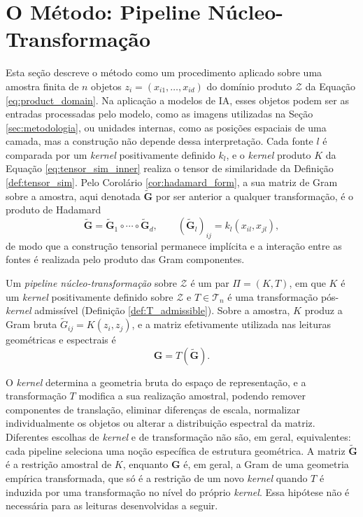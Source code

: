\section{O Método: Pipeline Núcleo-Transformação}
\label{sec:kernel_pipeline}

Esta seção descreve o método como um procedimento aplicado sobre uma amostra finita de $n$ objetos $z_i = (x_{i1},\dots,x_{id})$ do domínio produto $\mathcal{Z}$ da Equação \eqref{eq:product_domain}. Na aplicação a modelos de IA, esses objetos podem ser as entradas processadas pelo modelo, como as imagens utilizadas na Seção \ref{sec:metodologia}, ou unidades internas, como as posições espaciais de uma camada, mas a construção não depende dessa interpretação. Cada fonte $l$ é comparada por um \textit{kernel} positivamente definido $k_l$, e o \textit{kernel} produto $K$ da Equação \eqref{eq:tensor_sim_inner} realiza o tensor de similaridade da Definição \ref{def:tensor_sim}. Pelo Corolário \ref{cor:hadamard_form}, a sua matriz de Gram sobre a amostra, aqui denotada $\widetilde{\mathbf{G}}$ por ser anterior a qualquer transformação, é o produto de Hadamard
\begin{equation}\label{eq:raw_tensor_gram}
    \widetilde{\mathbf{G}} = \widetilde{\mathbf{G}}_1 \circ \cdots \circ \widetilde{\mathbf{G}}_d, \qquad (\widetilde{\mathbf{G}}_l)_{ij} = k_l(x_{il},x_{jl}),
\end{equation}
de modo que a construção tensorial permanece implícita e a interação entre as fontes é realizada pelo produto das Gram componentes.

\begin{definition}
\label{def:kernel_pipeline}
Um \emph{pipeline núcleo-transformação} sobre $\mathcal{Z}$ é um par $\Pi = (K,T)$, em que $K$ é um \textit{kernel} positivamente definido sobre $\mathcal{Z}$ e $T\in\mathcal{T}_n$ é uma transformação pós-\textit{kernel} admissível (Definição \ref{def:T_admissible}). Sobre a amostra, $K$ produz a Gram bruta $\widetilde{G}_{ij} = K(z_i,z_j)$, e a matriz efetivamente utilizada nas leituras geométricas e espectrais é
\begin{equation}\label{eq:transformed_gram}
    \mathbf{G} = T(\widetilde{\mathbf{G}}).
\end{equation}
\end{definition}

O \textit{kernel} determina a geometria bruta do espaço de representação, e a transformação $T$ modifica a sua realização amostral, podendo remover componentes de translação, eliminar diferenças de escala, normalizar individualmente os objetos ou alterar a distribuição espectral da matriz. Diferentes escolhas de \textit{kernel} e de transformação não são, em geral, equivalentes: cada pipeline seleciona uma noção específica de estrutura geométrica. A matriz $\widetilde{\mathbf{G}}$ é a restrição amostral de $K$, enquanto $\mathbf{G}$ é, em geral, a Gram de uma geometria empírica transformada, que só é a restrição de um novo \textit{kernel} quando $T$ é induzida por uma transformação no nível do próprio \textit{kernel}. Essa hipótese não é necessária para as leituras desenvolvidas a seguir.

